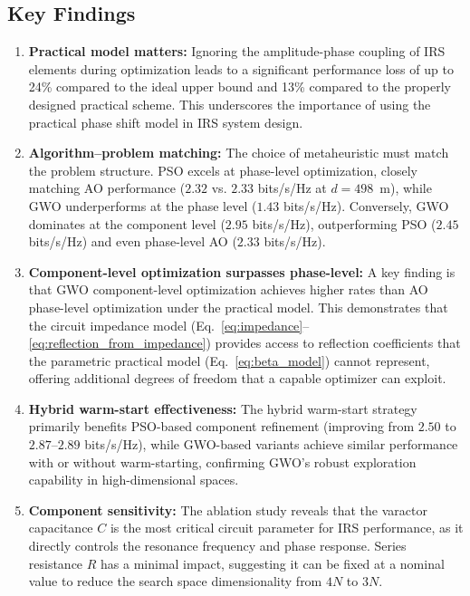 \documentclass[12pt,a4paper]{article}
\begin{document}
\subsection{Key Findings}

\begin{enumerate}
    \item \textbf{Practical model matters:} Ignoring the amplitude-phase coupling of IRS elements during optimization leads to a significant performance loss of up to 24\% compared to the ideal upper bound and 13\% compared to the properly designed practical scheme. This underscores the importance of using the practical phase shift model in IRS system design.

    \item \textbf{Algorithm--problem matching:} The choice of metaheuristic must match the problem structure. PSO excels at phase-level optimization, closely matching AO performance ($2.32$ vs. $2.33$ bits/s/Hz at $d = 498$~m), while GWO underperforms at the phase level ($1.43$ bits/s/Hz). Conversely, GWO dominates at the component level ($2.95$ bits/s/Hz), outperforming PSO ($2.45$ bits/s/Hz) and even phase-level AO ($2.33$ bits/s/Hz).

    \item \textbf{Component-level optimization surpasses phase-level:} A key finding is that GWO component-level optimization achieves higher rates than AO phase-level optimization under the practical model. This demonstrates that the circuit impedance model (Eq.~\eqref{eq:impedance}--\eqref{eq:reflection_from_impedance}) provides access to reflection coefficients that the parametric practical model (Eq.~\eqref{eq:beta_model}) cannot represent, offering additional degrees of freedom that a capable optimizer can exploit.

    \item \textbf{Hybrid warm-start effectiveness:} The hybrid warm-start strategy primarily benefits PSO-based component refinement (improving from $2.50$ to $2.87$--$2.89$ bits/s/Hz), while GWO-based variants achieve similar performance with or without warm-starting, confirming GWO's robust exploration capability in high-dimensional spaces.

    \item \textbf{Component sensitivity:} The ablation study reveals that the varactor capacitance $C$ is the most critical circuit parameter for IRS performance, as it directly controls the resonance frequency and phase response. Series resistance $R$ has a minimal impact, suggesting it can be fixed at a nominal value to reduce the search space dimensionality from $4N$ to $3N$.
\end{enumerate}
\end{document}

